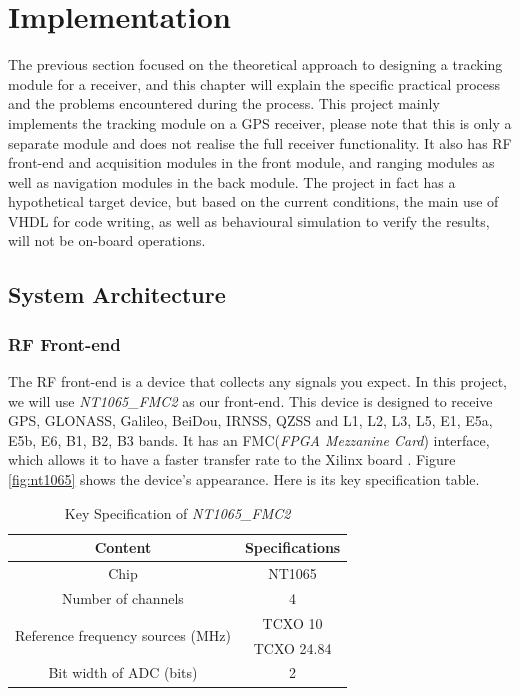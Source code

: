 \myClearDoublePage
\chapter{Implementation}

The previous section focused on the theoretical approach to designing a tracking module for a receiver, and this chapter will explain the specific practical process and the problems encountered during the process. This project mainly implements the tracking module on a GPS receiver, please note that this is only a separate module and does not realise the full receiver functionality. It also has RF front-end and acquisition modules in the front module, and ranging modules as well as navigation modules in the back module. The project in fact has a hypothetical target device, but based on the current conditions, the main use of VHDL for code writing, as well as behavioural simulation to verify the results, will not be on-board operations.

\section{System Architecture}
\subsection{RF Front-end}

The RF front-end is a device that collects any signals you expect. In this project, we will use \textit{NT1065\_FMC2} as our front-end. This device is designed to receive GPS, GLONASS, Galileo, BeiDou, IRNSS, QZSS and L1, L2, L3, L5, E1, E5a, E5b, E6, B1, B2, B3 bands. It has an FMC(\textit{FPGA Mezzanine Card}) interface, which allows it to have a faster transfer rate to the Xilinx board \cite{RN206}. Figure \ref{fig:nt1065} shows the device's appearance. Here is its key specification table.

\begin{table}[!htbp]
\centering
\caption{Key Specification of \textit{NT1065\_FMC2}}\label{tab:nt1065}
\renewcommand\arraystretch{1.5}
\begin{tabular}{cc}
    \toprule
    Content & Specifications \\
    \midrule
    Chip & NT1065 \\
    Number of channels & 4 \\
    \multirow{2}{*}{Reference frequency sources (MHz)} & TCXO 10 \\
     & TCXO 24.84 \\
    Bit width of ADC (bits) & 2 \\
    \bottomrule
\end{tabular}
\end{table}

